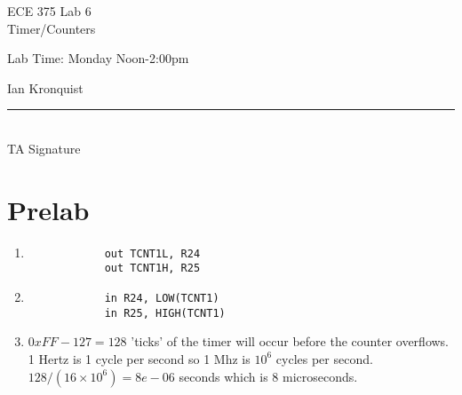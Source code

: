 \documentclass[12pt,letterpaper]{article}
\begin{document}
\begin{titlepage}
    \vspace*{4cm}
    \begin{flushright}
    {\huge
        ECE 375 Lab 6\\[1cm]
    }
    {\large
        Timer/Counters
    }
    \end{flushright}
    \begin{flushleft}
    Lab Time: Monday Noon-2:00pm
    \end{flushleft}
    \begin{flushright}
    Ian Kronquist
    \vfill
    \rule{5in}{.5mm}\\
    TA Signature
    \end{flushright}

\end{titlepage}

\section{Prelab}
\begin{enumerate}
    \item
        \begin{verbatim}
            out TCNT1L, R24
            out TCNT1H, R25
        \end{verbatim}

   \item
        \begin{verbatim}
            in R24, LOW(TCNT1)
            in R25, HIGH(TCNT1)
        \end{verbatim}
    \item $0xFF-127=128$ 'ticks' of the timer will occur before the counter overflows. 1 Hertz is 1 cycle per second so 1 Mhz is $10^6$ cycles per second. $128/(16 \times 10^6)=8e-06$ seconds which is 8 microseconds.
\end{enumerate} 
\end{document}
